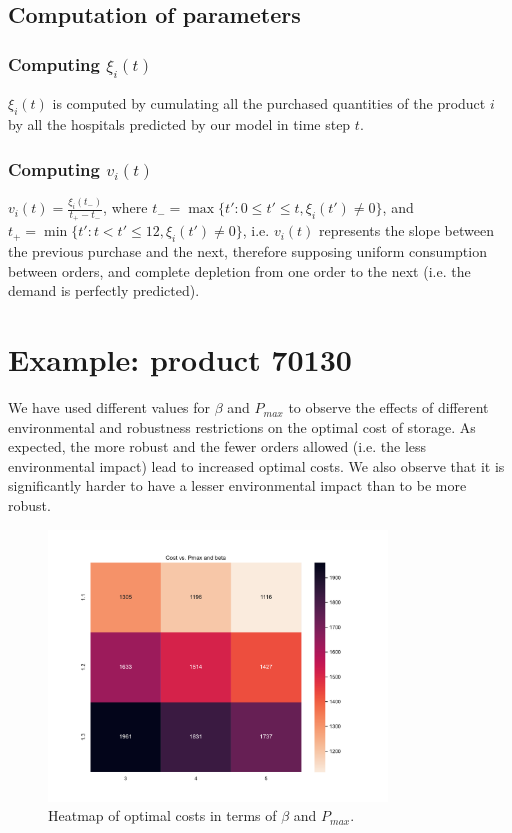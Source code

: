 \documentclass[11pt,twocolumn]{article}
\begin{document}
\subsection{Computation of parameters}
\subsubsection{Computing $\xi_i(t)$}
$\xi_i(t)$ is computed by cumulating all the purchased quantities of the product $i$ by all the hospitals predicted by our model in time step $t$.

\subsubsection{Computing $v_i(t)$}
$v_i(t)=\frac{\xi_i(t_-)}{t_+-t_-}$, where $t_-=\max\{t': 0\leq t'\leq t, \xi_i(t') \neq 0\}$, and $t_+=\min\{t':t<t'\leq 12, \xi_i(t')\neq 0\}$, i.e. $v_i(t)$ represents the slope between the previous purchase and the next, therefore supposing uniform consumption between orders, and complete depletion from one order to the next (i.e. the demand is perfectly predicted).


\section{Example: product 70130}

We have used different values for $\beta$ and $P_{max}$ to observe the effects of different environmental and robustness restrictions on the optimal cost of storage. As expected, the more robust and the fewer orders allowed (i.e. the less environmental impact) lead to increased optimal costs. We also observe that it is significantly harder to have a lesser environmental impact than to be more robust.

\begin{figure}[ht]
    \centering
    \includegraphics[width=9cm]{heatmap.pdf}
    \caption{Heatmap of optimal costs in terms of $\beta$ and $P_{max}$.}
    \label{fig:enter-label2}
\end{figure}
\end{document}
